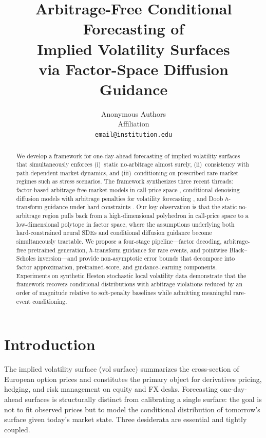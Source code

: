\documentclass{article}
\title{Arbitrage-Free Conditional Forecasting of \\ Implied Volatility Surfaces \\ via Factor-Space Diffusion Guidance}
\author{%
  Anonymous Authors \\
  Affiliation \\
  \texttt{email@institution.edu}
}
\newcommand{\1}{\mathbf{1}}
\begin{document}
\maketitle

\begin{abstract}
We develop a framework for one-day-ahead forecasting of implied volatility surfaces that simultaneously enforces (i)~static no-arbitrage almost surely, (ii)~consistency with path-dependent market dynamics, and (iii)~conditioning on prescribed rare market regimes such as stress scenarios. The framework synthesizes three recent threads: factor-based arbitrage-free market models in call-price space \citep{cohen2021}, conditional denoising diffusion models with arbitrage penalties for volatility forecasting \citep{jin2026}, and Doob $h$-transform guidance under hard constraints \citep{guo2026}. Our key observation is that the static no-arbitrage region pulls back from a high-dimensional polyhedron in call-price space to a low-dimensional polytope in factor space, where the assumptions underlying both hard-constrained neural SDEs and conditional diffusion guidance become simultaneously tractable. We propose a four-stage pipeline---factor decoding, arbitrage-free pretrained generation, $h$-transform guidance for rare events, and pointwise Black--Scholes inversion---and provide non-asymptotic error bounds that decompose into factor approximation, pretrained-score, and guidance-learning components. Experiments on synthetic Heston stochastic local volatility data demonstrate that the framework recovers conditional distributions with arbitrage violations reduced by an order of magnitude relative to soft-penalty baselines while admitting meaningful rare-event conditioning.
\end{abstract}

\section{Introduction}

The implied volatility surface (vol surface) summarizes the cross-section of European option prices and constitutes the primary object for derivatives pricing, hedging, and risk management on equity and FX desks. Forecasting one-day-ahead surfaces is structurally distinct from calibrating a single surface: the goal is not to fit observed prices but to model the conditional distribution of tomorrow's surface given today's market state. Three desiderata are essential and tightly coupled.
\end{document}
